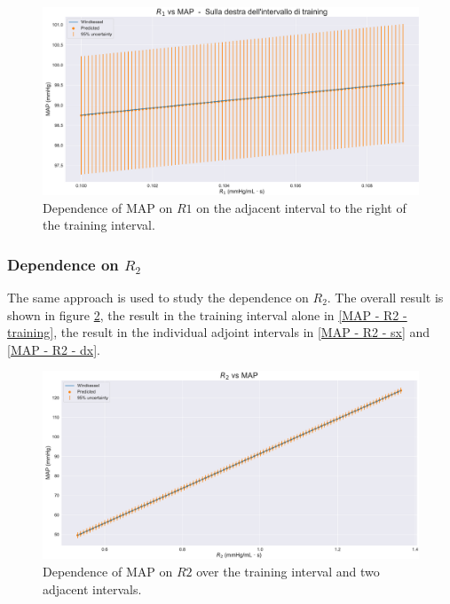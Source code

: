\begin{figure}
    \centering
    \includegraphics[width=1\textwidth]{images/Training (risultati)/MAP/MAP - R1 - dx.pdf}
    \caption{Dependence of MAP on $R1$ on the adjacent interval to the right of the training interval.}
    \label{MAP - R1 - dx}
\end{figure}




\newpage
\subsubsection{Dependence on $R_2$}
The same approach is used to study the dependence on $R_2$. The overall result is shown in figure \ref{MAP - R2 - full}, the result in the training interval alone in \ref{MAP - R2 - training}, the result in the individual adjoint intervals in \ref{MAP - R2 - sx} and \ref{MAP - R2 - dx}.

\begin{figure}[!htb]
    \centering
    \includegraphics[width=1\textwidth]{images/Training (risultati)/MAP/MAP - R2 - full.pdf}
    \caption{Dependence of MAP on $R2$ over the training interval and two adjacent intervals.}
    \label{MAP - R2 - full}
\end{figure}

